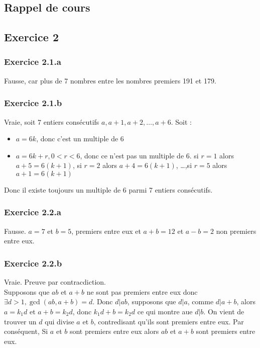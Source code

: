 \documentclass[]{book}
\theoremstyle{definition}
\begin{document}
\subsection*{Rappel de cours}


\newpage
\subsection*{Exercice 2}
\subsubsection*{Exercice 2.1.a}
Fausse, car plus de 7 nombres entre les nombres premiers 191 et 179.

\subsubsection*{Exercice 2.1.b}
Vraie, soit 7 entiers cons\'ecutifs $a, a+1, a+2, \ldots, a+6$. Soit :
\begin{itemize}
\item $a = 6k$, donc c'est un multiple de 6
\item $a = 6k + r, 0 < r < 6$, donc ce n'est pas un multiple de 6. si $r = 1$ alors $a+5 = 6(k+1)$, si $r = 2$ alors $a+4 = 6(k+1)$, \ldots,si $r = 5$ alors $a+1 = 6(k+1)$   
\end{itemize}

Donc il existe toujours un multiple de 6 parmi 7 entiers cons\'ecutifs.


\subsubsection*{Exercice 2.2.a}
Fausse. $a=7$ et $b=5$, premiers entre eux et $a+b=12$ et $a-b=2$ non premiers entre eux.

\subsubsection*{Exercice 2.2.b}
Vraie. Preuve par contracdiction.\\
Supposons que $ab$ et $a+b$ ne sont pas premiers entre eux donc $\exists d > 1, \gcd(ab, a+b) = d$. Donc $d|ab$, supposons que $d|a$, comme $d|a+b$, alors $a = k_1d$ et $a+b = k_2d$, donc $k_1d+b = k_2d$ ce qui montre aue $d|b$. On vient de trouver un $d$ qui divise $a$ et $b$, contredisant qu'ils sont premiers entre eux. Par cons\'equent, Si $a$ et $b$ sont premiers entre eux alors $ab$ et $a+b$ sont premiers entre eux.   
\end{document}
